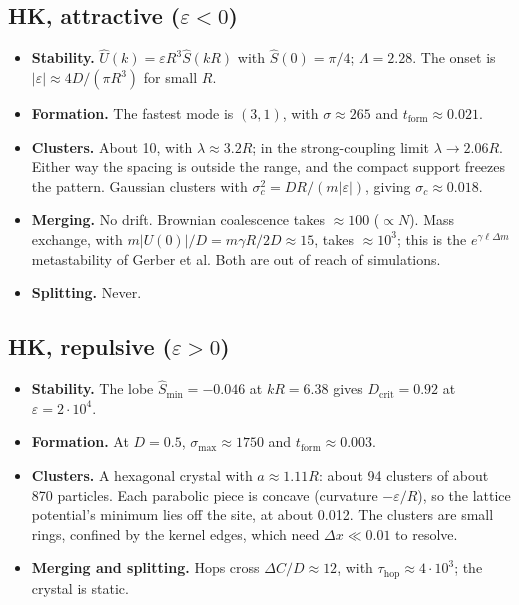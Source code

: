 \documentclass[11pt]{article}
\newcommand{\Uh}{\hat U}
\newcommand{\tf}{t_{\mathrm{form}}}
\begin{document}
\subsection{\texorpdfstring{HK, attractive ($\varepsilon<0$)}{HK, attractive}}
\begin{itemize}
  \item \textbf{Stability.} $\Uh(k)=\varepsilon R^3\hat S(kR)$ with
        $\hat S(0)=\pi/4$; $\Lambda=2.28$. The onset is
        $|\varepsilon|\approx4D/(\pi R^3)$ for small $R$.
  \item \textbf{Formation.} The fastest mode is $(3,1)$, with $\sigma\approx265$
        and $\tf\approx0.021$.
  \item \textbf{Clusters.} About 10, with $\lambda\approx3.2R$; in the
        strong-coupling limit $\lambda\to2.06R$. Either way the spacing is
        outside the range, and the compact support freezes the pattern.
        Gaussian clusters with $\sigma_c^2=DR/(m|\varepsilon|)$, giving
        $\sigma_c\approx0.018$.
  \item \textbf{Merging.} No drift. Brownian coalescence takes $\approx100$
        ($\propto N$). Mass exchange, with $m|U(0)|/D=m\gamma R/2D\approx15$,
        takes $\approx10^3$; this is the $e^{\gamma\ell\Delta m}$
        metastability of Gerber et al. Both are out of reach of simulations.
  \item \textbf{Splitting.} Never.
\end{itemize}

\subsection{\texorpdfstring{HK, repulsive ($\varepsilon>0$)}{HK, repulsive}}
\begin{itemize}
  \item \textbf{Stability.} The lobe $\hat S_{\min}=-0.046$ at $kR=6.38$ gives
        $D_{\mathrm{crit}}=0.92$ at $\varepsilon=2\cdot10^4$.
  \item \textbf{Formation.} At $D=0.5$, $\sigma_{\max}\approx1750$ and
        $\tf\approx0.003$.
  \item \textbf{Clusters.} A hexagonal crystal with $a\approx1.11R$: about 94
        clusters of about 870 particles. Each parabolic piece is concave
        (curvature $-\varepsilon/R$), so the lattice potential's minimum lies
        off the site, at about 0.012. The clusters are small rings, confined
        by the kernel edges, which need $\Delta x\ll0.01$ to resolve.
  \item \textbf{Merging and splitting.} Hops cross $\Delta C/D\approx12$,
        with $\tau_{\mathrm{hop}}\approx4\cdot10^3$; the crystal is static.
\end{itemize}
\end{document}
